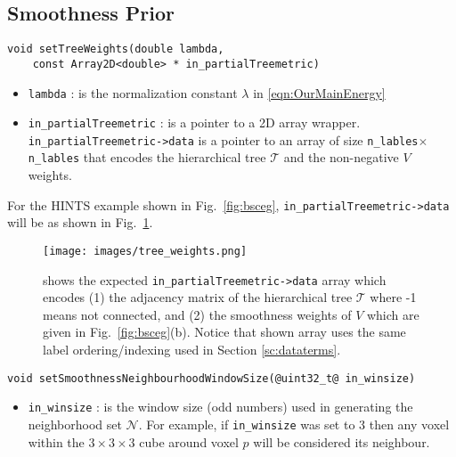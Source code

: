 \documentclass[12pt,letterpaper]{article}
\def\Tree{\mathcal{T}}
\def\neighbset{\mathcal{N}}
\def\Tree{\mathcal{T}}
\begin{document}
\subsection{Smoothness Prior}
\begin{lstlisting}
void setTreeWeights(double lambda,
    const Array2D<double> * in_partialTreemetric)
\end{lstlisting}
\begin{itemize}
\item \lstinline{lambda} : is the normalization constant $\lambda$ in \eqref{eqn:OurMainEnergy}
\item \lstinline{in_partialTreemetric} : is a pointer to a 2D array wrapper. \lstinline{in_partialTreemetric->data} is a pointer to an array of size \lstinline{n_lables}$\times$\lstinline{n_lables} that encodes the hierarchical tree $\Tree$ and the non-negative $V$ weights.
\end{itemize}
For the HINTS example shown in Fig.~\ref{fig:bsceg}, \lstinline{in_partialTreemetric->data} will be as shown in Fig.~\ref{fig:eg_treeweights}.
\begin{figure}[h]
\centering
\texttt{[image: images/tree\_weights.png]}
\caption{shows the expected  \lstinline{in_partialTreemetric->data} array which encodes (1) the adjacency matrix of the hierarchical tree $\Tree$ where -1 means not connected, and (2) the smoothness weights of $V$ which are given in Fig.~\ref{fig:bsceg}(b). Notice that shown array uses the same label ordering/indexing used in Section \ref{sc:dataterms}.}
\label{fig:eg_treeweights}
\end{figure}

\begin{lstlisting}
void setSmoothnessNeighbourhoodWindowSize(@uint32_t@ in_winsize)
\end{lstlisting}
\begin{itemize}
\item \lstinline{in_winsize} : is the window size (odd numbers) used in generating the neighborhood set $\neighbset$. For example, if \lstinline{in_winsize} was set to 3 then any voxel within the $3\times 3\times 3$ cube around voxel $p$ will be considered its neighbour.
\end{itemize}
\end{document}
